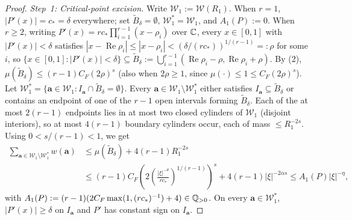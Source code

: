 \documentclass[11pt]{article}
\DeclareMathOperator{\RePart}{Re}
\begin{document}
\begin{proof}
\emph{Step~1: Critical-point excision.}
Write $\mathcal{W}_1:=\mathcal{W}(R_1)$. When $r=1$, $|P'(x)|=c_*=\delta$ everywhere; set $\widetilde{B}_\delta=\emptyset$, $\mathcal{W}_1^*=\mathcal{W}_1$, and $A_1(P):=0$. When $r\ge2$, writing $P'(x)=rc_*\prod_{i=1}^{r-1}(x-\rho_i)$ over $\mathbb C$, every $x\in[0,1]$ with $|P'(x)|<\delta$ satisfies $|x-\RePart\rho_i|\le|x-\rho_i|<(\delta/(rc_*))^{1/(r-1)}=:\rho$ for some $i$, so $\{x\in[0,1]:|P'(x)|<\delta\}\subseteq\widetilde{B}_\delta:=\bigcup_{i=1}^{r-1}(\RePart\rho_i-\rho,\RePart\rho_i+\rho)$. By (2), $\mu(\widetilde{B}_\delta)\le(r-1)C_F(2\rho)^s$ (also when $2\rho\ge1$, since $\mu(\cdot)\le1\le C_F(2\rho)^s$). Let $\mathcal{W}_1^*=\{\mathbf{a}\in\mathcal{W}_1:I_{\mathbf{a}}\cap\widetilde{B}_\delta=\emptyset\}$. Every $\mathbf{a}\in\mathcal{W}_1\setminus\mathcal{W}_1^*$ either satisfies $I_{\mathbf{a}}\subseteq\widetilde{B}_\delta$ or contains an endpoint of one of the $r-1$ open intervals forming $\widetilde{B}_\delta$. Each of the at most $2(r-1)$ endpoints lies in at most two closed cylinders of $\mathcal{W}_1$ (disjoint interiors), so at most $4(r-1)$ boundary cylinders occur, each of mass $\le R_1^{-2s}$. Using $0<s/(r-1)<1$, we get
\begin{align*}
\sum_{\mathbf{a}\in\mathcal{W}_1\setminus\mathcal{W}_1^*}w(\mathbf{a})
&\le\mu(\widetilde{B}_\delta)+4(r-1)R_1^{-2s}\\
&\le(r-1)C_F\!\left(2\left(\frac{|\xi|^{-\theta}}{rc_*}\right)^{1/(r-1)}\right)^s+4(r-1)|\xi|^{-2\alpha s}\le A_1(P)|\xi|^{-\eta},
\end{align*}
with $A_1(P):=(r-1)(2C_F\max(1,(rc_*)^{-1})+4)\in\mathbb Q_{>0}$. On every $\mathbf{a}\in\mathcal{W}_1^*$, $|P'(x)|\ge\delta$ on $I_{\mathbf{a}}$ and $P'$ has constant sign on $I_{\mathbf{a}}$.


\end{proof}
\end{document}
